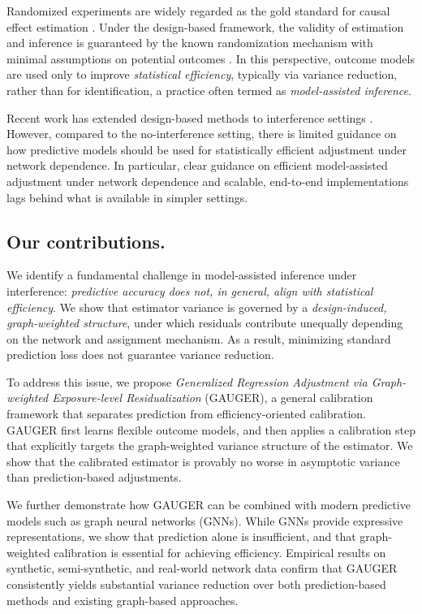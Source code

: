 \documentclass[twoside]{article}
\theoremstyle{plain}
\theoremstyle{definition}
\theoremstyle{remark}
\begin{document}
Randomized experiments are widely regarded as the gold standard for causal effect estimation \citep{hinkelmann2007design, imbens2015causal}. Under the design-based framework, the validity of estimation and inference is guaranteed by the known randomization mechanism with minimal assumptions on potential outcomes \citep{neyman1923application, rubin2005causal, ding2024first}. In this perspective, outcome models are used only to improve \emph{statistical efficiency}, typically via variance reduction, rather than for identification, a practice often termed as \emph{model-assisted inference}.

Recent work has extended design-based methods to interference settings \citep{hudgens2008toward, aronow2017estimating, basse2018analyzing, chang2023design, leung2022causal, gao2023causal}. However, compared to the no-interference setting, there is limited guidance on how predictive models should be used for statistically efficient adjustment under network dependence. In particular, clear guidance on efficient model-assisted adjustment under network dependence and scalable, end-to-end implementations lags behind what is available in simpler settings.

\subsection{Our contributions.}
We identify a fundamental challenge in model-assisted inference under interference: \emph{predictive accuracy does not, in general, align with statistical efficiency}. We show that estimator variance is governed by a \emph{design-induced, graph-weighted structure}, under which residuals contribute unequally depending on the network and assignment mechanism. As a result, minimizing standard prediction loss does not guarantee variance reduction.

To address this issue, we propose \emph{Generalized Regression Adjustment via Graph-weighted Exposure-level Residualization} (GAUGER), a general calibration framework that separates prediction from efficiency-oriented calibration. GAUGER first learns flexible outcome models, and then applies a calibration step that explicitly targets the graph-weighted variance structure of the estimator. We show that the calibrated estimator is provably no worse in asymptotic variance than prediction-based adjustments.

We further demonstrate how GAUGER can be combined with modern predictive models such as graph neural networks (GNNs). While GNNs provide expressive representations, we show that prediction alone is insufficient, and that graph-weighted calibration is essential for achieving efficiency. Empirical results on synthetic, semi-synthetic, and real-world network data confirm that GAUGER consistently yields substantial variance reduction over both prediction-based methods and existing graph-based approaches.
\end{document}
